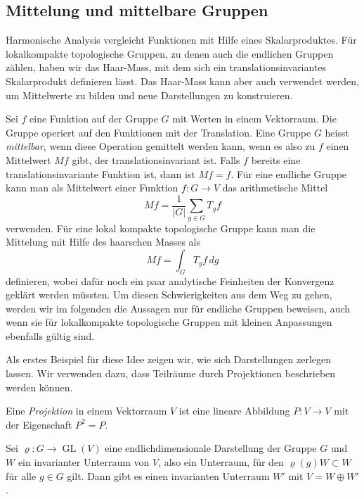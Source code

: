 %
%
%

%
%
\subsection{Mittelung und mittelbare Gruppen}
Harmonische Analysis vergleicht Funktionen mit Hilfe eines Skalarproduktes.
Für lokalkompakte topologische Gruppen, zu denen auch die endlichen Gruppen
zählen, haben wir das Haar-Mass, mit dem sich ein translationsinvariantes
Skalarprodukt definieren lässt.
Das Haar-Mass kann aber auch verwendet werden, um Mittelwerte zu bilden
und neue Darstellungen zu konstruieren.

Sei $f$ eine Funktion auf der Gruppe $G$ mit Werten in einem Vektorraum.
Die Gruppe operiert auf den Funktionen mit der Translation.
Eine Gruppe $G$ heisst {\em mittelbar}, wenn diese Operation gemittelt
werden kann, wenn es also zu $f$ einen Mittelwert $Mf$ gibt, der 
translationsinvariant ist.
Falls $f$ bereits eine translationsinvariante Funktion ist, dann 
ist $Mf=f$.
Für eine endliche Gruppe kann man als Mittelwert einer Funktion
$f\colon G\to V$ das arithmetische Mittel
\[
Mf
=
\frac{1}{|G|}
\sum_{g\in G} T_gf
\]
verwenden.
Für eine lokal kompakte topologische Gruppe kann man die Mittelung
mit Hilfe des haarschen Masses als
\[
Mf
=
\int_G T_gf\,dg
\]
definieren, wobei dafür noch ein paar analytische Feinheiten der
Konvergenz geklärt werden müssten.
Um diesen Schwierigkeiten aus dem Weg zu gehen, werden wir im folgenden
die Aussagen nur für endliche Gruppen beweisen, auch wenn sie für
lokalkompakte topologische Gruppen mit kleinen Anpassungen ebenfalls
gültig sind.

Als erstes Beispiel für diese Idee zeigen wir, wie sich Darstellungen 
zerlegen lassen.
Wir verwenden dazu, dass Teilräume durch Projektionen beschrieben
werden können.

\begin{definition}
\label{buch:gruppen:darstellungen:def:projektion}
Eine {\em Projektion} in einem Vektorraum $V$ ist eine lineare Abbildung
$P\colon V\to V$ mit der Eigenschaft $P^2=P$.
\end{definition}

\begin{satz}
\label{buch:gruppen:darstellungen:satz:projektion}
Sei $\varrho\colon G\to\operatorname{GL}(V)$  eine endlichdimensionale
Darstellung der Gruppe $G$ und $W$ ein invarianter Unterraum von $V$,
also ein Unterraum, für den $\varrho(g)W\subset W$ für alle $g\in G$ gilt.
Dann gibt es einen invarianten Unterraum $W'$ mit $V=W\oplus W'$.
\end{satz}

